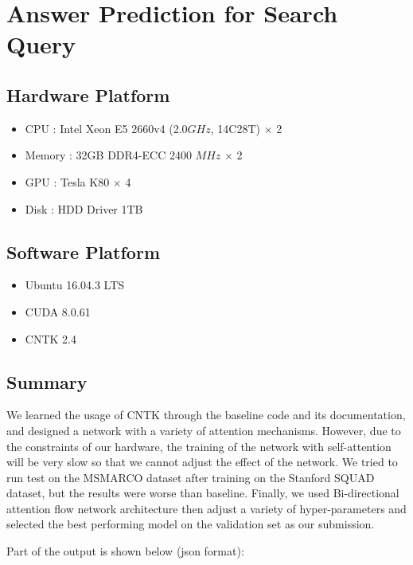\documentclass{mcmthesis}
\begin{document}
\section{Answer Prediction for Search Query}

\subsection{Hardware Platform}

\begin{itemize}
	\item CPU : Intel Xeon E5 2660v4 (2.0$GHz$, 14C28T) $\times$ 2 
	\item Memory : 32GB DDR4-ECC 2400 $MHz$ $\times$ 2
	\item GPU : Tesla K80 $\times$ 4
	\item Disk : HDD Driver 1TB 
\end{itemize}


\subsection{Software Platform}

\begin{itemize}
	\item Ubuntu 16.04.3 LTS
	\item CUDA 8.0.61
	\item CNTK 2.4
\end{itemize}


\subsection{Summary}
\par We learned the usage of CNTK through the baseline code and its documentation, and designed a network with a variety of attention mechanisms. However, due to the constraints of our hardware, the training of the network with self-attention will be very slow so that we cannot adjust the effect of the network. We tried to run test on the MSMARCO dataset after training on the Stanford SQUAD dataset, but the results were worse than baseline. Finally, we used Bi-directional attention flow network architecture then adjust a variety of hyper-parameters and selected the best performing model on the validation set as our submission.

\par Part of the output is shown below (json format):
\end{document}
